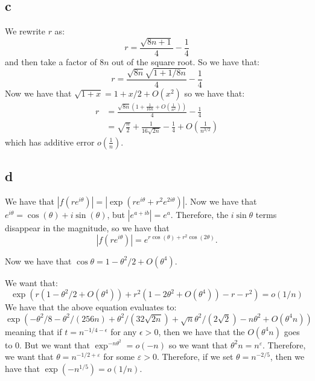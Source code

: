 \documentclass[]{article}
\begin{document}
\subsection{c}
We rewrite $r$ as:
\begin{equation}
	r = \frac{\sqrt{8n + 1}}{4} - \frac{1}{4}
\end{equation}
and then take a factor of $8n$ out of the square root. So we have that:
\begin{equation}
	r = \frac{\sqrt{8n}\sqrt{1+ 1/8n}}{4} - \frac{1}{4}
\end{equation}
Now we have that $\sqrt{1 + x} = 1 + x/2 + O(x^2)$ so we have that:
\begin{align*}
	r &= \frac{\sqrt{8n}\left(1 + \frac{1}{16n} + O(\frac{1}{n^2})\right)}{4} - \frac{1}{4}\\
	&= \sqrt{\frac{n}{2}} + \frac{1}{16 \sqrt{2 n}} - \frac{1}{4} + O(\frac{1}{n^{3/2}})
\end{align*}
which has additive error $o(\frac{1}{n})$. 

\subsection{d}
We have that $|f(r e^{i \theta})| = |\exp\left(r e^{i \theta} + r^2 e^{2 i \theta}\right)|$. Now we have that $e^{i \theta} = \cos(\theta) + i \sin (\theta)$, but $|e^{a + ib}| = e^a$. Therefore, the $i \sin \theta$ terms disappear in the magnitude, so we have that 
\begin{equation}
	|f(r e^{i \theta})| = e^{r \cos (\theta) + r^2 \cos (2 \theta)}. 
\end{equation}

Now we have that $\cos \theta = 1 - \theta^2/2 + O(\theta^4)$. 

We want that:
\begin{equation}
	\exp(r (1 - \theta^2/2 + O(\theta^4)) + r^2 (1 - 2 \theta^2 + O(\theta^4)) - r - r^2) = o(1/n)
\end{equation}
We have that the above equation evaluates to:
\begin{equation}
	\exp(
	-\theta^2/8 - \theta^2/(256n) + \theta^2/(32 \sqrt{2n}) + \sqrt{n} \theta^2/(2 \sqrt{2}) - n \theta^2 + O(\theta^4 n)
	)
\end{equation}
meaning that if $t = n^{-1/4 - \epsilon}$ for any $\epsilon > 0$, then we have that the $O(\theta^4 n)$ goes to 0. But we want that $\exp^{- n \theta^2} = o(-n)$ so we want that $\theta^2 n = n^\varepsilon$. Therefore, we want that $\theta = n^{-1/2 + \varepsilon}$ for some $\varepsilon > 0$. Therefore, if we set $\theta = n^{-2/5}$, then we have that $\exp(-n^{1/5}) = o(1/n)$.
\end{document}
